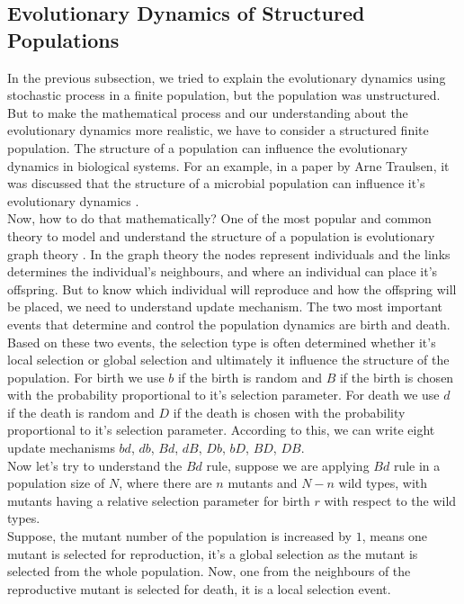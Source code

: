 \documentclass{article}
\begin{document}
\subsection{Evolutionary Dynamics of Structured Populations}
In the previous subsection, we tried to explain the evolutionary dynamics using stochastic process in a finite population, but the population was unstructured. But to make the mathematical process and our understanding about the evolutionary dynamics more realistic, we have to consider a structured finite population.
The structure of a population can influence the evolutionary dynamics in biological systems. For an example, in a paper by Arne Traulsen, it was discussed that the structure of a microbial population can influence it's evolutionary dynamics \citep{Traulsen2021}.\\
Now, how to do that mathematically? One of the most popular and common theory to model and understand the structure of a population is evolutionary graph theory \citep{Lieberman2005}. 
In the graph theory the nodes represent individuals and the links determines the individual's neighbours, and where an individual can place it's offspring. But to know which individual will reproduce and how the offspring will be placed, we need to understand update mechanism.
The two most important events that determine and control the population dynamics are birth and death. Based on these two events, the selection type is often determined whether it's local selection or global selection and ultimately it influence the structure of the population.
For birth we use $b$ if the birth is random and $B$ if the birth is chosen with the probability proportional to it's selection parameter.
For death we use $d$ if the death is random and $D$ if the death is chosen with the probability proportional to it's selection parameter.
According to this, we can write eight update mechanisms $bd$, $db$, $Bd$, $dB$, $Db$, $bD$, $BD$, $DB$.\\
Now let's try to understand the $Bd$ rule, suppose we are applying $Bd$ rule in a population size of $N$, where there are $n$ mutants and $N-n$ wild types, with mutants having a relative selection parameter for birth $r$ with respect to the wild types.\\
Suppose, the mutant number of the population is increased by $1$, means one mutant is selected for reproduction, it's a global selection as the mutant is selected from the whole population.
Now, one from the neighbours of the reproductive mutant is selected for death, it is a local selection event.\\
\end{document}
